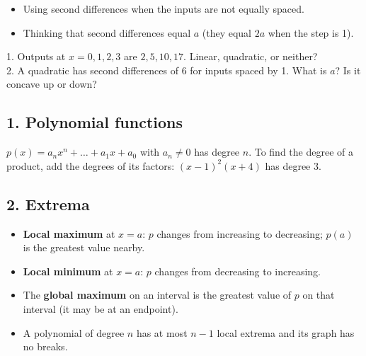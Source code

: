 \begin{mistakes}
\begin{itemize}
\item Using second differences when the inputs are not equally spaced.
\item Thinking that second differences equal $a$ (they equal $2a$ when the step is 1).
\end{itemize}
\end{mistakes}

\begin{quickcheck}
1. Outputs at $x=0,1,2,3$ are $2,5,10,17$. Linear, quadratic, or neither?\\
2. A quadratic has second differences of $6$ for inputs spaced by 1. What is $a$? Is it concave up or down?
\end{quickcheck}


\subsection*{1. Polynomial functions}
$p(x)=a_nx^n+\dots+a_1x+a_0$ with $a_n\neq0$ has degree $n$. To find the degree of a product, add the degrees of its factors: $(x-1)^2(x+4)$ has degree 3.

\subsection*{2. Extrema}
\begin{keyidea}
\begin{itemize}
\item \textbf{Local maximum} at $x=a$: $p$ changes from increasing to decreasing; $p(a)$ is the greatest value nearby.
\item \textbf{Local minimum} at $x=a$: $p$ changes from decreasing to increasing.
\item The \textbf{global maximum} on an interval is the greatest value of $p$ on that interval (it may be at an endpoint).
\item A polynomial of degree $n$ has at most $n-1$ local extrema and its graph has no breaks.
\end{itemize}
\end{keyidea}

